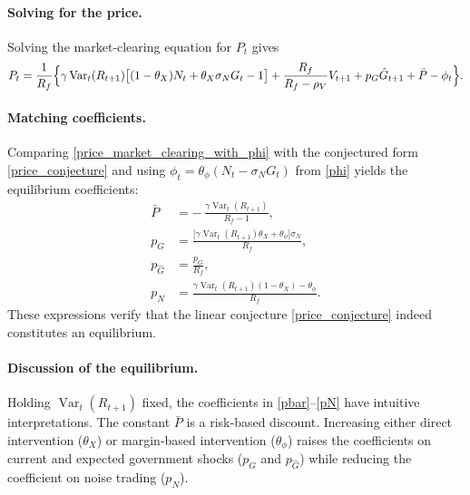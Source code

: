 \documentclass[12pt]{article}
\begin{document}
\paragraph{Solving for the price.}
Solving the market‑clearing equation for \(P_t\) gives
\begin{align}
    P_t = \frac{1}{R_f}
          \Bigl\{
              \gamma \operatorname{Var}_t(R_{t+1})
                  \bigl[ (1-\theta_X) N_t + \theta_X \sigma_N G_t - 1 \bigr]
              + \frac{R_f}{R_f - \rho_V} V_{t+1}
              + p_G \hat{G}_{t+1}
              + \bar{P}
              - \phi_t
          \Bigr\}. \label{price_market_clearing_with_phi}
\end{align}

\paragraph{Matching coefficients.}
Comparing \eqref{price_market_clearing_with_phi} with the conjectured form \eqref{price_conjecture} and using \(\phi_t = \theta_\phi (N_t - \sigma_N G_t)\) from \eqref{phi} yields the equilibrium coefficients:
\begin{align}
    \bar{P} &= -\,\frac{\gamma \operatorname{Var}_t(R_{t+1})}{R_f - 1}, \label{pbar}\\[4pt]
    p_G     &= \frac{\bigl[\gamma \operatorname{Var}_t(R_{t+1}) \theta_X + \theta_\phi\bigr] \sigma_N}{R_f}, \label{pG}\\[4pt]
    p_{\hat{G}} &= \frac{p_G}{R_f}, \label{pGhat}\\[4pt]
    p_N     &= \frac{\gamma \operatorname{Var}_t(R_{t+1}) (1-\theta_X) - \theta_\phi}{R_f}. \label{pN}
\end{align}
These expressions verify that the linear conjecture \eqref{price_conjecture} indeed constitutes an equilibrium.


\paragraph{Discussion of the equilibrium.}

Holding \(\operatorname{Var}_t(R_{t+1})\) fixed, the coefficients in \eqref{pbar}--\eqref{pN} have intuitive interpretations.  
The constant \(\bar{P}\) is a risk‑based discount.  
Increasing either direct intervention (\(\theta_X\)) or margin‑based intervention (\(\theta_\phi\)) raises the coefficients on current and expected government shocks (\(p_G\) and \(p_{\hat{G}}\)) while reducing the coefficient on noise trading (\(p_N\)).  
\end{document}
